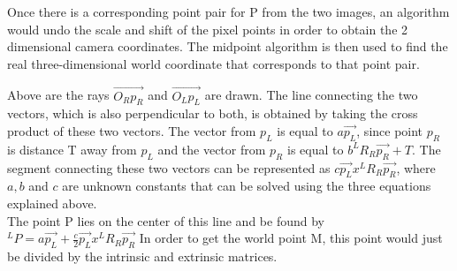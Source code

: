 \documentclass[12pt,twocolumn]{article}
\begin{document}
\indent Once there is a corresponding point pair for P from the two images, an algorithm would undo the scale and shift of the pixel points in order to obtain the 2 dimensional camera coordinates. The midpoint algorithm is then used to find the real three-dimensional world coordinate that corresponds to that point pair.\\ 
\indent Above are the rays $\vec{O_{R}p_{R}}$ and $\vec{O_{L}p_{L}}$ are drawn. The line connecting the two vectors, which is also perpendicular to both, is obtained by taking the cross product of these two vectors. The vector from $p_{L}$ is equal to $a\vec{p_{L}}$, since point $p_{R}$ is distance T away from $p_{L}$ and the vector from $p_{R}$ is equal to $b^{L}R_{R}\vec{p_{R}}+T$. The segment connecting these two vectors can be represented as $c\vec{p_{L}}x^{L}R_{R}\vec{p_{R}}$, where $a,b$ and $c$ are unknown constants that can be solved using the three equations explained above. \\
The point P lies on the center of this line and be found by $^{L}P=a\vec{p_{L}}+\frac{c}{2}\vec{p_{L}}x^{L}R_{R}\vec{p_{R}}$ In order to get the world point M, this point would just be divided by the intrinsic and extrinsic matrices.
\end{document}
